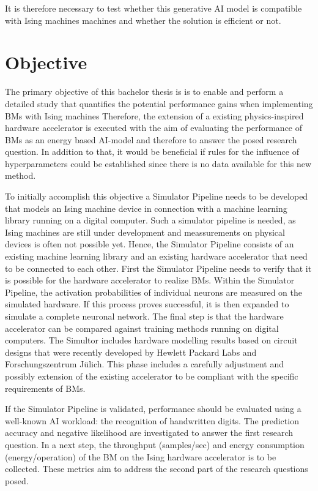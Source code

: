 It is therefore necessary to test whether this generative AI model is compatible with Ising machines
machines and whether the solution is efficient or not.


\section{Objective}

The primary objective of this bachelor thesis is is to
enable and perform a detailed study that quantifies the potential performance gains when implementing \ac{BM}s with Ising machines
Therefore, the extension of a existing physics-inspired
hardware accelerator is executed with the aim of evaluating the performance of \ac{BM}s as an energy based 
AI-model and therefore to answer the posed research question. 
In addition to that, it would be beneficial if rules for the influence of hyperparameters could be established
since there is no data available for this new method.

To initially accomplish this objective a Simulator Pipeline needs to be developed that models an Ising machine device in connection with a machine learning library running on a digital computer.
Such a simulator pipeline is needed, as Ising machines are still under development and meassurements on physical devices is often not possible yet.
Hence, the Simulator Pipeline consists of an existing machine learning library and an existing hardware accelerator
that need to be connected to each other.
First the Simulator Pipeline needs to verify that it is possible for the hardware accelerator
to realize \ac{BM}s. 
Within the Simulator Pipeline, the activation probabilities of individual neurons are measured on the simulated hardware.
If this process proves successful, it is then expanded to simulate a complete neuronal network.
The final step is that the hardware accelerator can be compared against training methods running on digital computers.
The Simultor includes hardware modelling results based on circuit designs that were recently developed by Hewlett Packard Labs and Forschungszentrum Jülich.
This phase includes a carefully adjustment and possibly extension of the existing accelerator to be compliant 
with the specific requirements of \ac{BM}s.

If the Simulator Pipeline is validated, performance should be evaluated using a well-known AI workload: the recognition of handwritten digits.
The prediction accuracy and negative likelihood are investigated to answer the first research question.
In a next step, the throughput (samples/sec) and energy consumption (energy/operation) of the \ac{BM} on the Ising hardware accelerator is to be collected.
These metrics aim to address the second part of the research questions posed.

